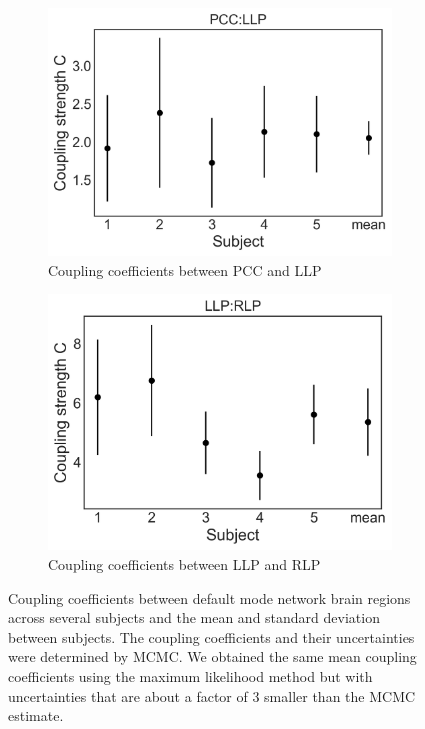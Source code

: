 \documentclass[%
 reprint,
 amsmath,amssymb,
 aps,
]{revtex4-1}
\begin{document}
\begin{figure}[H]
    \begin{subfigure}[b]{0.4\textwidth}
        \includegraphics[width=\textwidth]{pcc_llpMCMC.png}
        \caption{Coupling coefficients between PCC and LLP}
        \label{fig:llp_pcc}
    \end{subfigure}
    \begin{subfigure}[b]{0.4\textwidth}
        \includegraphics[width=\textwidth]{llp_rlpMCMC.png}
        \caption{Coupling coefficients between LLP and RLP}
        \label{fig:rlp_llp}
    \end{subfigure}
	\caption{Coupling coefficients between default mode network brain regions across several subjects and the mean and standard deviation between subjects.  The coupling coefficients and their uncertainties were determined by MCMC.  We obtained the same mean coupling coefficients using the maximum likelihood method but with uncertainties that are about a factor of 3 smaller than the MCMC estimate.}\label{fig:coupling_coef}
\end{figure}
\end{document}
